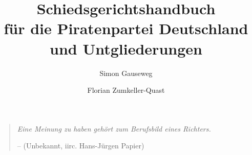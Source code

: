 \documentclass{sghandbuch}
\author{Simon Gauseweg \and Florian Zumkeller-Quast}
\title{Schiedsgerichtshandbuch\\
für die Piratenpartei Deutschland und Untgliederungen\\
\hfill\break
\hfill\break
\normalsize{\documentversion}}
\begin{document}
\maketitle

\onecolumn			%
\thispagestyle{plain}		%
\hfill				%
\vfill				%
\begin{quote}
\centering			%
\itshape
\Huge
Eine Meinung zu haben gehört zum Berufsbild eines Richters.
\par
\begin{flushright}
\Large
\normalfont
-- (Unbekannt, iirc. Hans-Jürgen Papier)
\end{flushright}
\end{quote}
\hfill				%
\vfill				%
\clearpage			%
\twocolumn			%

\tableofcontents
























\appendix


\onecolumn
\printbibliography[heading=bibliography]
\twocolumn

\printindex[jurisdiction]
\end{document}
